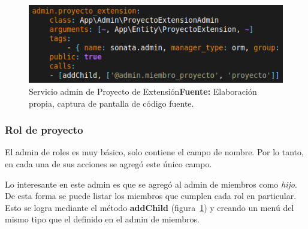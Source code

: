 \begin{figure}[h]
    \includegraphics[width=1\linewidth]{image/addChild.png}
    \caption{Servicio admin de Proyecto de Extensión\newline \textbf{Fuente:} Elaboración propia, captura de pantalla de código fuente.}
    \label{fig:image/addChild}
\end{figure}

\subsubsection{Rol de proyecto}%
\label{ssub:rol_de_proyecto_admin}

El admin de roles es muy básico, solo contiene el campo de nombre. Por lo tanto, en cada una de sus acciones se agregó este único campo.


Lo interesante en este admin es que se agregó al admin de miembros como \textit{hijo}. De esta forma se puede listar los miembros que cumplen cada rol en
particular.
Esto se logra mediante el método \textbf{addChild} (figura~\ref{fig:image/addChild}) y creando un menú del mismo tipo que el definido en el admin de miembros.
